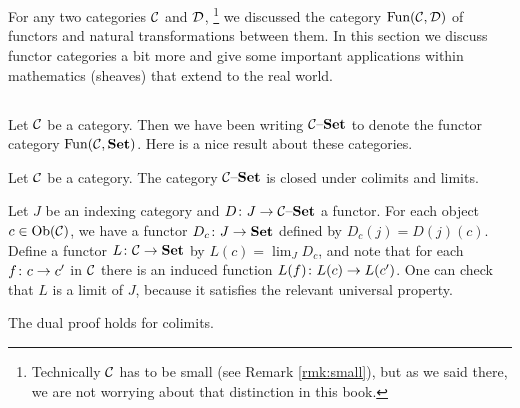\documentclass[CT4S-EN-RU]{subfiles}
\begin{document}
\section{}

\begin{blockENG}
For any two categories $\mathcal{C}$ and $\mathcal{D}$,
\footnote{Technically $\mathcal{C}$ has to be small (see Remark \ref{rmk:small}), but as we said there, we are not worrying about that distinction in this book.}
we discussed the category $\textnormal{Fun}(\mathcal{C},\mathcal{D})$ of functors and natural transformations between them. In this section we discuss functor categories a bit more and give some important applications within mathematics (sheaves) that extend to the real world.
\end{blockENG}

\begin{blockRUS}
\end{blockRUS}


\subsection{}

\begin{blockENG}
Let $\mathcal{C}$ be a category. Then we have been writing $\mathcal{C}{\text \textendash}{\bf Set}$ to denote the functor category $\textnormal{Fun}(\mathcal{C},{\bf Set})$. Here is a nice result about these categories.
\end{blockENG}

\begin{blockRUS}
\end{blockRUS}

\begin{propositionENG}\label{prop:inst closed under colim lim}
Let $\mathcal{C}$ be a category. The category $\mathcal{C}{\text \textendash}{\bf Set}$ is closed under colimits and limits.
\end{propositionENG}

\begin{propositionRUS}\label{prop:inst closed under colim lim}
\end{propositionRUS}

\begin{proofENG}
Let $J$ be an indexing category and $D\colon J\rightarrow\mathcal{C}{\text \textendash}{\bf Set}$ a functor. For each object $c\in\textnormal{Ob}(\mathcal{C})$, we have a functor $D_c\colon J\rightarrow{\bf Set}$ defined by $D_c(j)=D(j)(c)$. Define a functor $L\colon\mathcal{C}\rightarrow{\bf Set}$ by $L(c)=\lim_J D_c$, and note that for each $f\colon c\rightarrow c'$ in $\mathcal{C}$ there is an induced function $L(f)\colon L(c)\rightarrow L(c')$. One can check that $L$ is a limit of $J$, because it satisfies the relevant universal property. 

The dual proof holds for colimits.
\end{proofENG}
\end{document}
